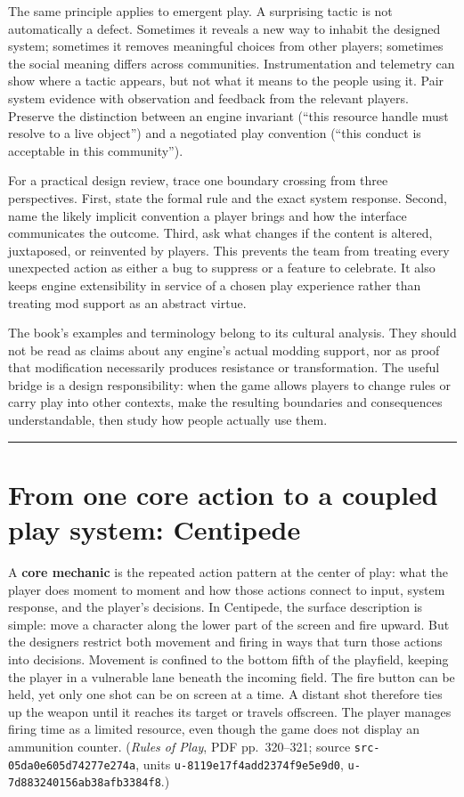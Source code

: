 The same principle applies to emergent play. A surprising tactic is not automatically a defect. Sometimes it reveals a new way to inhabit the designed system; sometimes it removes meaningful choices from other players; sometimes the social meaning differs across communities. Instrumentation and telemetry can show where a tactic appears, but not what it means to the people using it. Pair system evidence with observation and feedback from the relevant players. Preserve the distinction between an engine invariant (``this resource handle must resolve to a live object'') and a negotiated play convention (``this conduct is acceptable in this community'').

For a practical design review, trace one boundary crossing from three perspectives. First, state the formal rule and the exact system response. Second, name the likely implicit convention a player brings and how the interface communicates the outcome. Third, ask what changes if the content is altered, juxtaposed, or reinvented by players. This prevents the team from treating every unexpected action as either a bug to suppress or a feature to celebrate. It also keeps engine extensibility in service of a chosen play experience rather than treating mod support as an abstract virtue.

The book's examples and terminology belong to its cultural analysis. They should not be read as claims about any engine's actual modding support, nor as proof that modification necessarily produces resistance or transformation. The useful bridge is a design responsibility: when the game allows players to change rules or carry play into other contexts, make the resulting boundaries and consequences understandable, then study how people actually use them.

\begin{center}\rule{0.5\linewidth}{0.5pt}\end{center}

\section{From one core action to a coupled play system: Centipede}\label{06-engine-ii-ch046-from-one-core-action-to-a-coupled-play-system-centipede}

A \textbf{core mechanic} is the repeated action pattern at the center of play: what the player does moment to moment and how those actions connect to input, system response, and the player's decisions. In Centipede, the surface description is simple: move a character along the lower part of the screen and fire upward. But the designers restrict both movement and firing in ways that turn those actions into decisions. Movement is confined to the bottom fifth of the playfield, keeping the player in a vulnerable lane beneath the incoming field. The fire button can be held, yet only one shot can be on screen at a time. A distant shot therefore ties up the weapon until it reaches its target or travels offscreen. The player manages firing time as a limited resource, even though the game does not display an ammunition counter. (\emph{Rules of Play}, PDF pp.~320--321; source \texttt{src-05da0e605d74277e274a}, units \texttt{u-8119e17f4add2374f9e5e9d0}, \texttt{u-7d883240156ab38afb3384f8}.)


